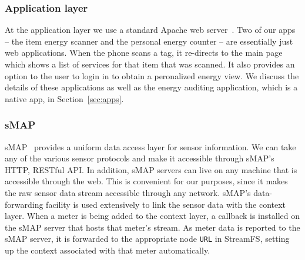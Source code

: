 \subsubsection{Application layer}
At the application layer we use a standard Apache web server~\cite{apache}.  Two of our apps -- the item
energy scanner and the personal energy counter -- are essentially just web applications.  When the phone scans a tag, it
re-directs to the main page which shows a list of services for that item that was scanned.  It also provides an option
to the user to login in to obtain a peronalized energy view.  We discuss the details of these applications as well
as the energy auditing application, which is a native app, in Section~\ref{sec:apps}.

\subsubsection{sMAP}
\label{sec:smap}
sMAP~\cite{smap} provides a uniform data access layer for sensor information.  We can take any of the various sensor protocols
and make it accessible through sMAP's HTTP, RESTful API.  In addition, sMAP servers can live on any machine that is accessible
through the web.  This is convenient for our purposes, since it makes the raw sensor data stream accessible through any network.
sMAP's data-forwarding facility is used extensively to link the sensor data with the context layer.  When a meter is being added
to the context layer, a callback is installed on the sMAP server that hosts that meter's stream.  As meter data is reported 
to the sMAP server, it is forwarded to the appropriate node {\tt URL} in StreamFS, setting up the context associated with that
meter automatically.


